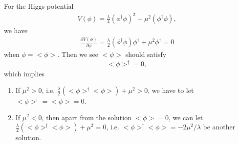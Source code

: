 \documentclass[11pt]{article}
\def\del{{\partial}}
\begin{document}
\section{ }
For the Higgs potential
\begin{eqnarray}
  V(\phi) = \frac{\lambda}{4} (\phi^\dagger \phi)^2
  + \mu^2 (\phi^\dagger \phi),
\end{eqnarray}
we have
\begin{eqnarray}
  \frac{\del V(\phi)}{\del \phi} = \frac{\lambda}{2}(\phi^\dagger \phi) \phi^\dagger + \mu^2 \phi^\dagger = 0
\end{eqnarray}
when $\phi=<\phi>$. Then we see $<\psi>$ should satisfy
\begin{eqnarray}
  [\frac{\lambda}{2} (<\phi>^\dagger <\phi>) + \mu^2] <\phi>^\dagger = 0,
\end{eqnarray}
which implies
\begin{enumerate}
  \item If $\mu^2 > 0$, i.e. $\frac{\lambda}{2} (<\phi>^\dagger <\phi>) + \mu^2>0$, we have to let $<\phi>^\dagger = <\phi> = 0$.
  \item If $\mu^2 < 0$, then apart from the solution $<\phi> = 0$, we can let
  $\frac{\lambda}{2} (<\phi>^\dagger <\phi>) + \mu^2=0$, i.e. $<\phi>^\dagger <\phi> = -2\mu^2/\lambda$ be another solution.
\end{enumerate}
\end{document}
